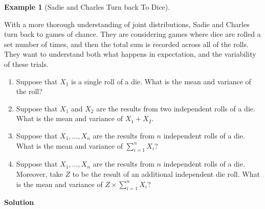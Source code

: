 \documentclass[
  letterpaper,
  DIV=11,
  numbers=noendperiod]{scrreprt}
\providecommand{\tightlist}{%
  \setlength{\itemsep}{0pt}\setlength{\parskip}{0pt}}\usepackage{longtable,booktabs,array}
\theoremstyle{definition}
\theoremstyle{definition}
\newtheorem{example}{Example}[chapter]
\theoremstyle{definition}
\theoremstyle{remark}
\begin{document}
\begin{example}[Sadie and Charles Turn back To
Dice]\protect\hypertarget{exm-independent-rv-expectation}{}\label{exm-independent-rv-expectation}

With a more thorough understanding of joint distributions, Sadie and
Charles turn back to games of chance. They are considering games where
dice are rolled a set number of times, and then the total sum is
recorded across all of the rolls. They want to understand both what
happens in expectation, and the variability of these trials.

\begin{enumerate}
\def\labelenumi{\alph{enumi}.}
\tightlist
\item
  Suppose that \(X_1\) is a single roll of a die. What is the mean and
  variance of the roll?
\item
  Suppose that \(X_1\) and \(X_2\) are the results from two independent
  rolls of a die. What is the mean and variance of \(X_1 + X_2\).
\item
  Suppose that \(X_1,\dots,X_n\) are the results from \(n\) independent
  rolls of a die. What is the mean and variance of \(\sum_{i=1}^n X_i\)?
\item
  Suppose that \(X_1,\dots,X_n\) are the results from \(n\) independent
  rolls of a die. Moreover, take \(Z\) to be the result of an additional
  independent die roll. What is the mean and variance of
  \(Z\times \sum_{i=1}^n X_i\)?
\end{enumerate}

\begin{tcolorbox}[enhanced jigsaw, colback=white, colframe=quarto-callout-color-frame, arc=.35mm, leftrule=.75mm, rightrule=.15mm, opacityback=0, breakable, bottomrule=.15mm, left=2mm, toprule=.15mm]

\vspace{-3mm}\textbf{Solution}\vspace{3mm}


\end{tcolorbox}
\end{example}
\end{document}
